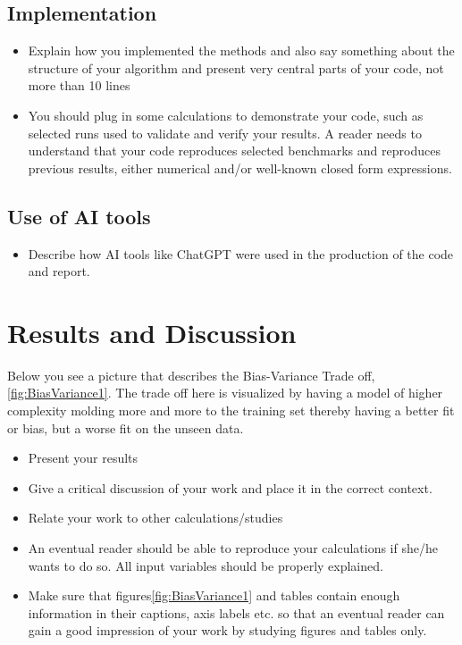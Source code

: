 \documentclass[amssymb,twocolumn,aps]{revtex4}
\begin{document}
\subsection{Implementation}

\begin{itemize}
    \item Explain how you implemented the methods and also say something about the structure of your algorithm and present very central parts of your code, not more than 10 lines
    \item You should plug in some calculations to demonstrate your code, such as selected runs used to validate and verify your results. A reader needs to understand that your code reproduces selected benchmarks and reproduces previous results, either numerical and/or well-known closed form expressions.
\end{itemize}

\subsection{Use of AI tools}
	
\begin{itemize}
    \item Describe how AI tools like ChatGPT were used in the production of the code and report.
\end{itemize}
	
\section{Results and Discussion}\label{section:results} 
Below you see a picture that describes the Bias-Variance Trade off, \ref{fig:BiasVariance1}. The trade off here is visualized by having a model of higher complexity molding more and more to the training set thereby having a better fit or bias, but a worse fit on the unseen data.


\begin{itemize}
    \item Present your results
    \item Give a critical discussion of your work and place it in the correct context.
    \item Relate your work to other calculations/studies
    \item An eventual reader should be able to reproduce your calculations if she/he wants to do so. All input variables should be properly explained.
    \item Make sure that figures\ref{fig:BiasVariance1} and tables contain enough information in their captions, axis labels etc. so that an eventual reader can gain a good impression of your work by studying figures and tables only.
\end{itemize}
\end{document}

